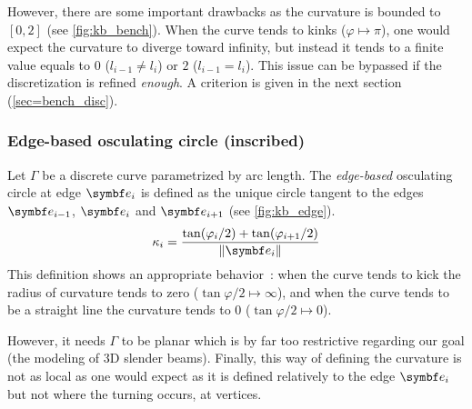 However, there are some important drawbacks as the curvature is bounded to $[0,2]$ (see \cref{fig:kb_bench}). When the curve tends to kinks ($\varphi \mapsto \pi$), one would expect the curvature to diverge toward infinity, but instead it tends to a finite value equals to $0$ ($l_{i-1} \neq l_i$) or $2$ ($l_{i-1} = l_i$). This issue can be bypassed if the discretization is refined \emph{enough}. A criterion is given in the next section (\cref{sec=bench_disc}).

\subsubsection{Edge-based osculating circle (inscribed)}
Let $\Gamma$ be a discrete curve parametrized by arc length. The \emph{edge-based} osculating circle at edge $\vect{e}_{i}$ is defined as the unique circle tangent to the edges $\vect{e}_{i-1}$, $\vect{e}_{i}$ and $\vect{e}_{i+1}$ (see \cref{fig:kb_edge}).
\begin{equation}
	\kappa_i = \frac{\tan(\varphi_i/2) + \tan(\varphi_{i+1}/2)}{\norm{\vect{e}_{i}}}
\label{eq:def_kb_edge}
\end{equation}
This definition shows an appropriate behavior~: when the curve tends to kick the radius of curvature tends to zero ($\tan \varphi/2 \mapsto \infty$), and when the curve tends to be a straight line the curvature tends to $0$ ($\tan \varphi/2 \mapsto 0$).

However, it needs $\Gamma$ to be planar which is by far too restrictive regarding our goal (the modeling of 3D slender beams). Finally, this way of defining the curvature is not as local as one would expect as it is defined relatively to the edge $\vect{e}_{i}$ but not where the turning occurs, at vertices.


